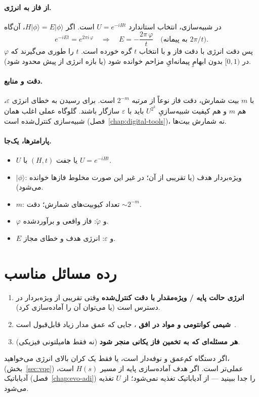 \paragraph{از فاز به انرژی.}
در شبیه‌سازی، انتخاب استاندارد $U=e^{-iHt}$ است. اگر $H\lvert\phi\rangle=E\lvert\phi\rangle$، آن‌گاه
\begin{equation}
	e^{-iEt}=e^{2\pi i\,\varphi}
	\quad\Rightarrow\quad
	E = -\frac{2\pi\,\varphi}{t}
	\quad\text{(به پیمانه $2\pi/t$).}
\end{equation}
پس دقت انرژی با دقت فاز و با انتخاب $t$ گره خورده است. $t$ را طوری می‌گیرند که $\varphi$ در $[0,1)$ بدون ابهامِ پیمانه‌ایِ مزاحم خوانده شود (یا بازه انرژی از پیش محدود شود).

\paragraph{دقت و منابع.}
با $m$ بیت شمارش، دقت فاز نوعاً از مرتبه $2^{-m}$ است. برای رسیدن به خطای انرژی $\varepsilon$، هم $m$ و هم کیفیت شبیه‌سازیِ $U^{2^{k}}$ باید با $\varepsilon$ سازگار باشند. گلوگاه عملی اغلب همان شبیه‌سازی کنترل‌شده است (فصل~\ref{chap:digital-tools})، نه شمارش بیت‌ها.

\paragraph{پارامترها، یک‌جا.}
\begin{itemize}
	\item $U$ یا جفت $(H,t)$ با $U=e^{-iHt}$.
	\item $\lvert\phi\rangle$: ویژه‌بردار هدف (یا تقریبی از آن؛ در غیر این صورت مخلوط فازها خوانده می‌شود).
	\item $m$: تعداد کیوبیت‌های شمارش؛ دقت $\sim 2^{-m}$.
	\item $\varphi$ و $\tilde\varphi$: فاز واقعی و برآوردشده.
	\item $E$ و $\varepsilon$: انرژی هدف و خطای مجاز.
\end{itemize}

\section{رده مسائل مناسب }

\begin{enumerate}
	\item \textbf{انرژی حالت پایه / ویژه‌مقدار با دقت کنترل‌شده} وقتی تقریبی از ویژه‌بردار در دسترس است (یا می‌توان آن را آماده‌سازی کرد).
	\item \textbf{شیمی کوانتومی و مواد در افق }، جایی که عمق مدار زیاد قابل‌قبول است~\cite{McArdle2020}.
	\item \textbf{هر مسئله‌ای که به تخمین فاز یکانی منجر شود} (نه فقط هامیلتونی فیزیکی).
\end{enumerate}
اگر دستگاه کم‌عمق و نوفه‌دار است، یا فقط یک کران بالای انرژی می‌خواهید،  (بخش~\ref{sec:vqe}) عملی‌تر است. اگر هدف آماده‌سازی پایه از مسیر $H(s)$ است، آدیاباتیک (فصل~\ref{chap:evo-adi}) را جدا ببینید ---  از آدیاباتیک تغذیه نمی‌شود؛ از $U$ تغذیه می‌شود.

